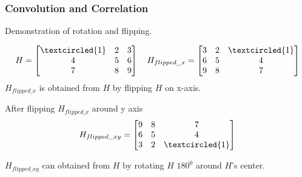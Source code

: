 \documentclass[english,11pt,table,handout]{beamer}
\begin{document}
{
	\frametitle{Convolution and Correlation}

	
	\begin{example}
		Demonstration of rotation and flipping.
		
		$$
		H = 
		\begin{bmatrix}
		\textcircled{1} & 2 & 3 \\
		4 & 5 & 6 \\
		7 & 8 & 9 \\
		\end{bmatrix}
		\quad
		H_{flipped\_x} = 
		\begin{bmatrix}
		3 & 2 & \textcircled{1} \\
		6 & 5 & 4 \\
		9 & 8 & 7 \\
		\end{bmatrix}
		$$
		$H_{flipped\_x}$ is obtained from $H$ by flipping $H$ on x-axis.
		
		After flipping $H_{flipped\_x}$ around y axis
		$$
		H_{flipped\_xy} = 
		\begin{bmatrix}
		9 & 8 & 7 \\
		6 & 5 & 4 \\
		3 & 2 & \textcircled{1} \\
		\end{bmatrix}
		$$
		
		$H_{flipped\_xy}$ can obtained from $H$ by rotating $H$	$180^0$ around $H$'s center.
		\end{example}
}
\end{document}
